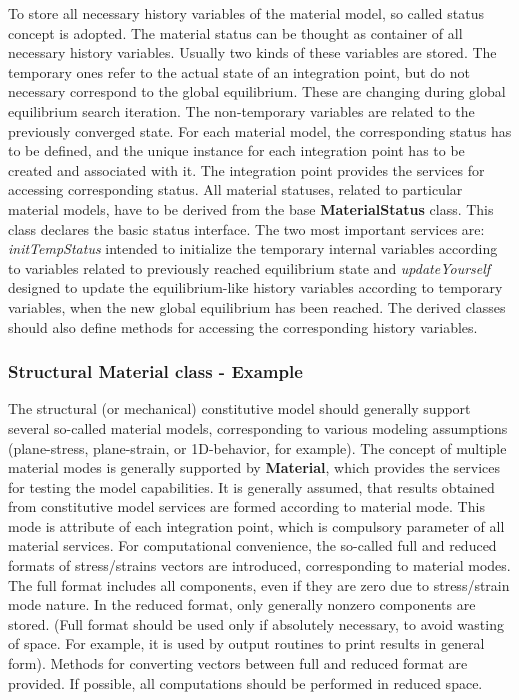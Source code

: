 \documentclass[12pt,draft]{article}
\newcommand{\class}[1]{{\bf #1}}
\newcommand{\service}[1]{{\em #1}}
\begin{document}
To store all necessary history variables of the material model, so called
status concept is adopted. The material status can be thought as 
container of all necessary history variables. Usually two kinds of
these variables are stored. The temporary ones refer to the actual
state of an integration point, but do not necessary correspond to
the global equilibrium. These are changing during global equilibrium search
iteration. The non-temporary variables are related to the 
previously converged state. 
For each material model, the corresponding status has to be defined,
and the unique instance for each integration point has to be created
and associated with it. The integration point provides the services for
accessing corresponding status. 
All material statuses, related to particular material models, have
to be derived from the base \class{MaterialStatus} class. This class
declares the basic status interface. The two most important services
are: \service{initTempStatus} intended to initialize the temporary
internal variables according to variables related to previously reached
equilibrium state and \service{updateYourself} designed to update the 
equilibrium-like history variables according to temporary variables,
when the new global equilibrium has been reached. The derived classes
should also define methods for accessing the corresponding history
variables.


 \subsubsection{Structural Material class - Example}
 The structural (or mechanical) constitutive model should generally
 support several so-called material models, corresponding to various
 modeling assumptions (plane-stress, plane-strain, or 1D-behavior,
 for example). The concept of multiple material modes is generally
 supported by \class{Material}, which provides the services for testing
 the model capabilities. It is generally assumed, that results obtained 
 from constitutive model services are formed according to 
 material mode. This mode is attribute of each integration point, 
 which is compulsory parameter of all material  services. For
 computational convenience, the so-called full and reduced formats of 
 stress/strains vectors are introduced, corresponding to material
 modes.
 The full format includes all components, even if they are zero due to stress/strain mode nature.
 In the reduced format, only generally nonzero components are stored.
 (Full format should be used only if absolutely necessary, to avoid
 wasting of space. For example, it is used 
 by output routines to print results in general form). Methods for converting vectors between 
 full and reduced format are provided. If possible, all computations 
 should be performed in reduced space.
\end{document}
